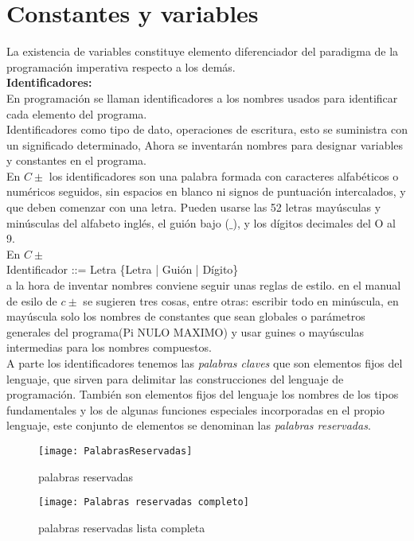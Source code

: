 \documentclass[11pt,a4paper]{article}
\begin{document}
\section{Constantes y variables}
 La existencia de variables constituye elemento diferenciador del paradigma de la programación imperativa respecto a los demás.\\
 \textbf{Identificadores:}\\
En programación se 
llaman identificadores a los nombres usados para identificar cada elemento del 
programa.\\
 Identificadores como tipo de dato, operaciones de escritura, esto se suministra con un significado determinado, Ahora se inventarán nombres para designar variables y constantes en el programa.\\
 En $C\pm$ los identificadores son una palabra formada con caracteres alfabéticos 
 o numéricos seguidos, sin espacios en blanco ni signos de puntuación intercalados, y que deben comenzar con una letra. Pueden usarse las 52 letras 
 mayúsculas y minúsculas del alfabeto inglés, el guión bajo ($\_$), y los dígitos 
 decimales del O al 9.\\
 En $C\pm$\\
 Identificador ::= Letra \{Letra | Guión | Dígito\}
 \\
 a la hora de inventar nombres conviene seguir unas reglas de estilo. en el manual de esilo de $c\pm$ se sugieren tres cosas, entre otras: escribir todo en minúscula, en mayúscula solo los nombres de constantes que sean globales o parámetros generales del programa(Pi NULO MAXIMO) y usar guines o mayúsculas intermedias para los nombres compuestos.\\ 
 A parte los identificadores tenemos las \textit{palabras claves} que son elementos fijos del lenguaje, que sirven para delimitar las construcciones del lenguaje de programación. También son elementos fijos del lenguaje los nombres de los tipos fundamentales y los de algunas 
 funciones especiales incorporadas en el propio lenguaje, este conjunto de elementos se denominan las \textit{palabras reservadas}. 
 \begin{figure}[htb]
 	\centering
 	\texttt{[image: PalabrasReservadas]}
 	\caption{palabras reservadas}
 	\label{fig:palabras reserv}
 \end{figure}
 \begin{figure}[htb]
 	\centering
 	\texttt{[image: Palabras reservadas completo]}
 	\caption{palabras reservadas lista completa}
 	\label{fig:palabras reserv}
 \end{figure}
 
\end{document}
